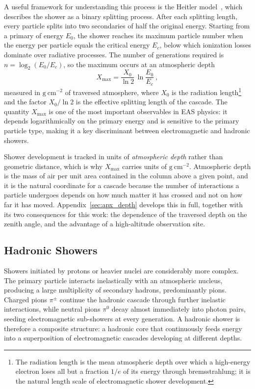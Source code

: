 A useful framework for understanding this process is the Heitler model~, which describes the shower as a binary splitting process. After each splitting length, every particle splits into two secondaries of half the original energy. Starting from a primary of energy $E_0$, the shower reaches its maximum particle number when the energy per particle equals the critical energy $E_c$, below which ionization losses dominate over radiative processes. The number of generations required is $n = \log_2(E_0/E_c)$, so the maximum occurs at an atmospheric depth
\begin{equation}
    X_{\text{max}} = \frac{X_0}{\ln 2}\,\ln{\frac{E_0}{E_c}} \ ,
    \label{eq:xmax}
\end{equation}
measured in $\mathrm{g \ cm}^{-2}$ of traversed atmosphere, where $X_0$ is the radiation length\footnote{The radiation length is the mean atmospheric depth over which a high-energy electron loses all but a fraction $1/e$ of its energy through bremsstrahlung; it is the natural length scale of electromagnetic shower development.} and the factor $X_0/\ln 2$ is the effective splitting length of the cascade. The quantity $X_{\text{max}}$ is one of the most important observables in EAS physics: it depends logarithmically on the primary energy and is sensitive to the primary particle type, making it a key discriminant between electromagnetic and hadronic showers.

Shower development is tracked in units of \textit{atmospheric depth} rather than geometric distance, which is why $X_{\text{max}}$ carries units of $\mathrm{g \ cm}^{-2}$. Atmospheric depth is the mass of air per unit area contained in the column above a given point, and it is the natural coordinate for a cascade because the number of interactions a particle undergoes depends on how much matter it has crossed and not on how far it has moved. Appendix~\ref{sec:apx_depth} develops this in full, together with its two consequences for this work: the dependence of the traversed depth on the zenith angle, and the advantage of a high-altitude observation site.

\subsection{Hadronic Showers}
\label{subsec:hadronic_showers}

Showers initiated by protons or heavier nuclei are considerably more complex. The primary particle interacts inelastically with an atmospheric nucleus, producing a large multiplicity of secondary hadrons, predominantly pions. Charged pions $\pi^\pm$ continue the hadronic cascade through further inelastic interactions, while neutral pions $\pi^0$ decay almost immediately into photon pairs, seeding electromagnetic sub-showers at every generation. A hadronic shower is therefore a composite structure: a hadronic core that continuously feeds energy into a superposition of electromagnetic cascades developing at different depths.

